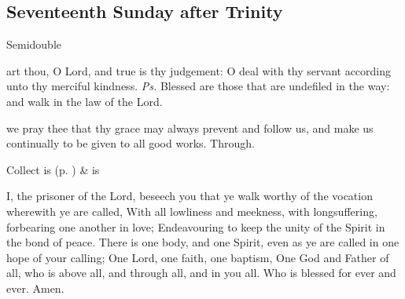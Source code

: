 \clearpage
\subsection{Seventeenth Sunday after Trinity}
\begin{inhead}
{Semidouble}
\end{inhead}


\introit
{} art thou, O Lord, and true is thy judgement: O deal with thy servant according unto thy merciful kindness. \textit{Ps.} Blessed are those that are undefiled in the way: and walk in the law of the Lord.

\collect
{} we pray thee that thy grace may always prevent and follow us, and make us continually to be given to all good works. Through.


\begin{rubric}
     Collect is  (p. \pageref{SPSaints}) \&  is 
\end{rubric}

 I, the prisoner of the Lord, beseech you that ye walk worthy of the vocation wherewith ye are called, With all lowliness and meekness, with longsuffering, forbearing one another in love; Endeavouring to keep the unity of the Spirit in the bond of peace. There is one body, and one Spirit, even as ye are called in one hope of your calling; One Lord, one faith, one baptism, One God and Father of all, who is above all, and through all, and in you all. Who is blessed for ever and ever. Amen.


